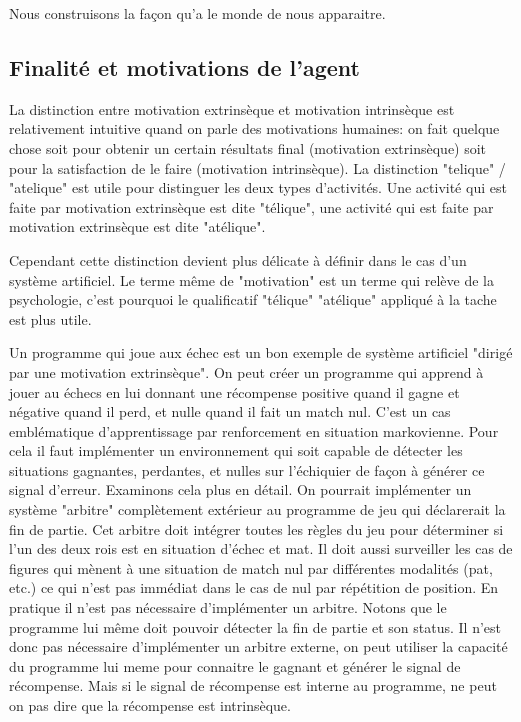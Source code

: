 Nous construisons la façon qu'a le monde de nous apparaitre.


\subsection{Finalité et motivations de l'agent}
\label{sec:motivation_intrinseque}

\noindent
La distinction entre motivation extrinsèque et motivation intrinsèque est relativement intuitive quand on parle des motivations humaines: on fait quelque chose soit pour obtenir un certain résultats final (motivation extrinsèque) soit pour la satisfaction de le faire (motivation intrinsèque).
La distinction "telique" / "atelique" est utile pour distinguer les deux types d'activités. 
Une activité qui est faite par motivation extrinsèque est dite "télique", une activité qui est faite par motivation extrinsèque est dite "atélique". 

Cependant cette distinction devient plus délicate à définir dans le cas d'un système artificiel.
Le terme même de "motivation" est un terme qui relève de la psychologie, c'est pourquoi le qualificatif "télique" "atélique" appliqué à la tache est plus utile. 


Un programme qui joue aux échec est un bon exemple de système artificiel "dirigé par une motivation extrinsèque". 
On peut créer un programme qui apprend à jouer au échecs en lui donnant une récompense positive quand il gagne et négative quand il perd, et nulle quand il fait un match nul. 
C'est un cas emblématique d'apprentissage par renforcement en situation markovienne.
Pour cela il faut implémenter un environnement qui soit capable de détecter les situations gagnantes, perdantes, et nulles sur l'échiquier de façon à générer ce signal d'erreur. 
Examinons cela plus en détail.
On pourrait implémenter un système "arbitre" complètement extérieur au programme de jeu qui déclarerait la fin de partie. 
Cet arbitre doit intégrer toutes les règles du jeu pour déterminer si l'un des deux rois est en situation d'échec et mat. 
Il doit aussi surveiller les cas de figures qui mènent à une situation de match nul par différentes modalités (pat, etc.) ce qui n'est pas immédiat dans le cas de nul par répétition de position. 
En pratique il n'est pas nécessaire d'implémenter un arbitre. 
Notons que le programme lui même doit pouvoir détecter la fin de partie et son status.
Il n'est donc pas nécessaire d'implémenter un arbitre externe, on peut utiliser la capacité du programme lui meme pour connaitre le gagnant et générer le signal de récompense. 
Mais si le signal de récompense est interne au programme, ne peut on pas dire que la récompense est intrinsèque. 


